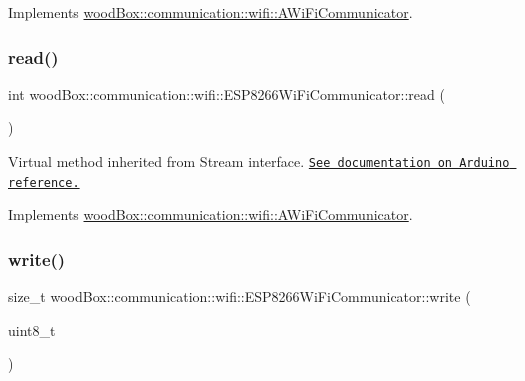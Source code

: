 Implements \mbox{\hyperlink{classwood_box_1_1communication_1_1wifi_1_1_a_wi_fi_communicator_ae0a1f2f1906f76a12dd5f9b7c10b1282}{wood\+Box\+::communication\+::wifi\+::\+A\+Wi\+Fi\+Communicator}}.

\mbox{\label{classwood_box_1_1communication_1_1wifi_1_1_e_s_p8266_wi_fi_communicator_a3bd1c8f72256e92c6dbdab9272fd3543}} 
\subsubsection{\texorpdfstring{read()}{read()}}
{\footnotesize\ttfamily int wood\+Box\+::communication\+::wifi\+::\+E\+S\+P8266\+Wi\+Fi\+Communicator\+::read (\begin{DoxyParamCaption}{ }\end{DoxyParamCaption})\hspace{0.3cm}{\ttfamily [virtual]}}

Virtual method inherited from Stream interface. \href{https://www.arduino.cc/reference/en/language/functions/communication/stream/streamread/}{\tt See documentation on Arduino reference.} 

Implements \mbox{\hyperlink{classwood_box_1_1communication_1_1wifi_1_1_a_wi_fi_communicator_af4bc1adc96c124e769eb8c54d76476cf}{wood\+Box\+::communication\+::wifi\+::\+A\+Wi\+Fi\+Communicator}}.

\mbox{\label{classwood_box_1_1communication_1_1wifi_1_1_e_s_p8266_wi_fi_communicator_a6bb904e5302da7ec3fefc6e9a896f5f8}} 
\subsubsection{\texorpdfstring{write()}{write()}}
{\footnotesize\ttfamily size\+\_\+t wood\+Box\+::communication\+::wifi\+::\+E\+S\+P8266\+Wi\+Fi\+Communicator\+::write (\begin{DoxyParamCaption}\item[{uint8\+\_\+t}]{ }\end{DoxyParamCaption})\hspace{0.3cm}{\ttfamily [virtual]}}


